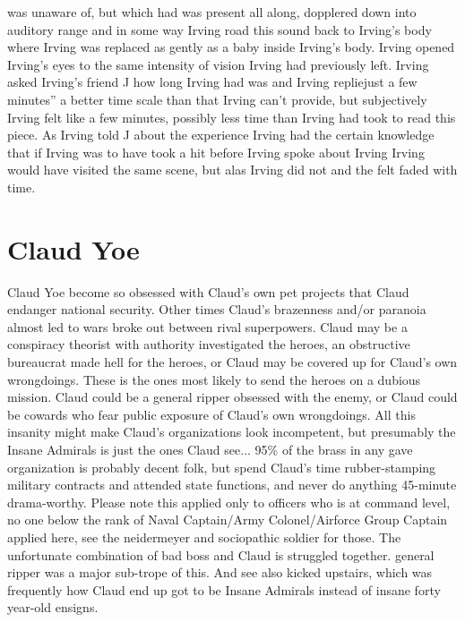 \documentclass[12pt]{book}
\begin{document}
was unaware of, but which had was present all along, dopplered down into auditory range and in some way Irving road this sound back to Irving's body where Irving was replaced as gently as a baby inside Irving's body. Irving opened Irving's eyes to the same intensity of vision Irving had previously left. Irving asked Irving's friend J how long Irving had was and Irving repliejust a few minutes'' a better time scale than that Irving can't provide, but subjectively Irving felt like a few minutes, possibly less time than Irving had took to read this piece. As Irving told J about the experience Irving had the certain knowledge that if Irving was to have took a hit before Irving spoke about Irving Irving would have visited the same scene, but alas Irving did not and the felt faded with time.



\chapter{Claud Yoe}

Claud Yoe become so obsessed with Claud's own pet projects that Claud endanger national security. Other times Claud's brazenness and/or paranoia almost led to wars broke out between rival superpowers. Claud may be a conspiracy theorist with authority investigated the heroes, an obstructive bureaucrat made hell for the heroes, or Claud may be covered up for Claud's own wrongdoings. These is the ones most likely to send the heroes on a dubious mission. Claud could be a general ripper obsessed with the enemy, or Claud could be cowards who fear public exposure of Claud's own wrongdoings. All this insanity might make Claud's organizations look incompetent, but presumably the Insane Admirals is just the ones Claud see... 95\% of the brass in any gave organization is probably decent folk, but spend Claud's time rubber-stamping military contracts and attended state functions, and never do anything 45-minute drama-worthy. Please note this applied only to officers who is at command level, no one below the rank of Naval Captain/Army Colonel/Airforce Group Captain applied here, see the neidermeyer and sociopathic soldier for those. The unfortunate combination of bad boss and Claud is struggled together. general ripper was a major sub-trope of this. And see also kicked upstairs, which was frequently how Claud end up got to be Insane Admirals instead of insane forty year-old ensigns.
\end{document}
